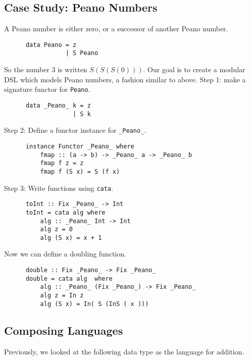 \documentclass[a4paper,12pt]{article}
\theoremstyle{remark}
\begin{document}
  \subsection{Case Study: Peano Numbers}

  A Peano number is either zero, or a successor of another Peano number.

  \begin{lstlisting}
      data Peano = z
                 | S Peano  \end{lstlisting}

  So the number 3 is written $S(S(S (0)))$. Our goal is to create a
  modular DSL which models Peano numbers, a fashion similar to above.
  Step 1: make a signature functor for \lstinline{Peano}.

  \begin{lstlisting}
      data _Peano_ k = z
                   | S k  \end{lstlisting}

  Step 2: Define a functor instance for \lstinline{_Peano_}.

  \begin{lstlisting}
      instance Functor _Peano_ where
          fmap :: (a -> b) -> _Peano_ a -> _Peano_ b
          fmap f z = z
          fmap f (S x) = S (f x)  \end{lstlisting}

  Step 3: Write functions using \lstinline{cata}.

  \begin{lstlisting}
      toInt :: Fix _Peano_ -> Int
      toInt = cata alg where
          alg :: _Peano_ Int -> Int
          alg z = 0
          alg (S x) = x + 1  \end{lstlisting}

  Now we can define a doubling function.

  \begin{lstlisting}
      double :: Fix _Peano_ -> Fix _Peano_
      double = cata alg  where
          alg :: _Peano_ (Fix _Peano_) -> Fix _Peano_
          alg z = In z
          alg (S x) = In( S (InS ( x )))  \end{lstlisting}

  \subsection{Composing Languages}

  Previously, we looked at the following data type as the language for addition.
\end{document}
